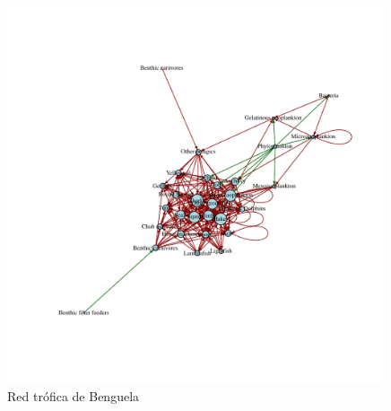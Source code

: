 \begin{figure}[!htbp]
  \centering
  \includegraphics[width = 0.99\textwidth]{./Plots/Benguela.pdf}
  \caption[Benguela]{Red tr\'ofica de Benguela \citep{yodzis1998:localTD}}
  \label{fig:Benguela}
\end{figure}



